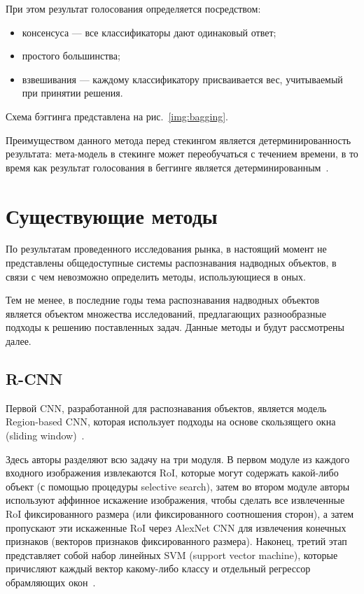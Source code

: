 При этом результат голосования определяется посредством:
\begin{itemize}[label=---]
    \item консенсуса --- все классификаторы дают одинаковый ответ;
    \item простого большинства;
    \item взвешивания --- каждому классификатору присваивается вес, учитываемый при принятии решения.
\end{itemize}

Схема бэггинга представлена на рис.~\ref{img:bagging}.


Преимуществом данного метода перед стекингом является детерминированность результата: мета-модель в стекинге может переобучаться с течением времени, в то время как результат голосования в беггинге является детерминированным~\cite{ensembles}.

\section{Существующие методы}

По результатам проведенного исследования рынка, в настоящий момент не представлены общедоступные системы распознавания надводных объектов, в связи с чем невозможно определить методы, использующиеся в оных. 

Тем не менее, в последние годы тема распознавания надводных объектов является объектом множества исследований, предлагающих разнообразные подходы к решению поставленных задач. Данные методы и будут рассмотрены далее.

\subsection{R-CNN}

Первой CNN, разработанной для распознавания объектов, является модель Region-based CNN, которая использует подходы на основе скользящего окна (sliding window)~\cite{r-cnn}.

Здесь авторы разделяют всю задачу на три модуля. В первом модуле из каждого входного изображения извлекаются RoI, которые могут содержать какой-либо объект (с помощью процедуры selective search), затем во втором модуле авторы используют аффинное искажение изображения, чтобы сделать все извлеченные RoI фиксированного размера (или фиксированного соотношения сторон), а затем пропускают эти искаженные RoI через AlexNet CNN для извлечения конечных признаков (векторов признаков фиксированного размера). Наконец, третий этап представляет собой набор линейных SVM (support vector machine), которые причисляют каждый вектор какому-либо классу и отдельный регрессор обрамляющих окон~\cite{r-cnn}.

